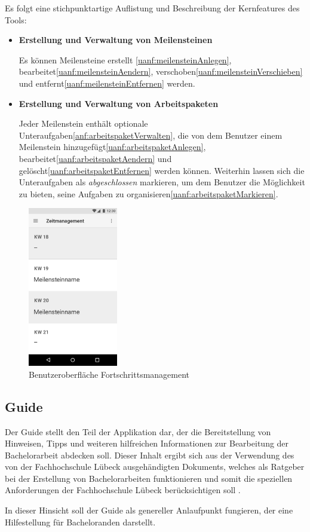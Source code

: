 \documentclass[bibliography=totoc,listof=totoc,BCOR=5mm,DIV=12,oneside]{scrbook}
\begin{document}
\par\bigskip Es folgt eine stichpunktartige Auflistung und Beschreibung der Kernfeatures des Tools:
\begin{itemize}
\item \textbf{Erstellung und Verwaltung von Meilensteinen}
\par Es können Meilensteine erstellt \ref{uanf:meilensteinAnlegen}, bearbeitet\ref{uanf:meilensteinAendern}, verschoben\ref{uanf:meilensteinVerschieben} und entfernt\ref{uanf:meilensteinEntfernen} werden. 
\item \textbf{Erstellung und Verwaltung von Arbeitspaketen}
\par Jeder Meilenstein enthält optionale Unteraufgaben\ref{anf:arbeitspaketVerwalten}, die von dem Benutzer einem Meilenstein hinzugefügt\ref{uanf:arbeitspaketAnlegen}, bearbeitet\ref{uanf:arbeitspaketAendern} und gelöscht\ref{uanf:arbeitspaketEntfernen} werden können. Weiterhin lassen sich die Unteraufgaben als \textit{abgeschlossen} markieren, um dem Benutzer die Möglichkeit zu bieten, seine Aufgaben zu organisieren\ref{uanf:arbeitspaketMarkieren}.
\end{itemize}

\begin{figure}[H]
	\centering
	\includegraphics[width=0.35\textwidth, keepaspectratio]{Bilder/Prototyp/Zeitmanagement.png}
	\caption{Benutzeroberfläche Fortschrittsmanagement}
	\label{img:fortschrittsmanagement}
\end{figure}

\par \medskip


\newpage
\subsection{Guide}
\par Der Guide stellt den Teil der Applikation dar, der die Bereitstellung von Hinweisen, Tipps und weiteren hilfreichen Informationen zur Bearbeitung der Bachelorarbeit abdecken soll. Dieser Inhalt ergibt sich aus der Verwendung des von der Fachhochschule Lübeck ausgehändigten Dokuments, welches als Ratgeber bei der Erstellung von Bachelorarbeiten funktionieren und somit die speziellen Anforderungen der Fachhochschule Lübeck berücksichtigen soll \citep[vgl. Kapitel 1]{FHLuebeckBAAnleitung}.
\par In dieser Hinsicht soll der Guide als genereller Anlaufpunkt fungieren, der eine Hilfestellung für Bacheloranden darstellt.
\end{document}
